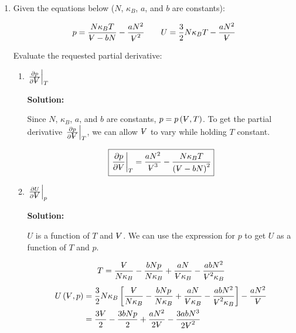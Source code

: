 \documentclass[10pt]{article}
\newenvironment{Solution}
    {\textbf{Solution:}
    
    \vspace{5mm}
    \begin{tcolorbox}
    }
    {
    \end{tcolorbox}
    \vspace{5mm}
    }
\newcommand{\vol}{{\ooalign{\hfil$V$\hfil\cr\kern0.08em--\hfil\cr}}}
\begin{document}
\begin{enumerate}
\begin{enumerate}
\begin{Solution}
    
    \end{Solution}

\end{enumerate}

\item Given the equations below ($N$, $\kappa_B$, $a$, and $b$ are constants):

\begin{equation}
    p = \frac{N\kappa_B T}{\vol -b N}-\frac{a N^2}{\vol^2} \qquad U = \frac{3}{2} N \kappa_B T - \frac{a N^2}{\vol}
\end{equation}

Evaluate the requested partial derivative: 

\begin{enumerate}
    \item $\left.\frac{\partial p}{\partial \vol}\right|_T$
    
    
    \begin{Solution}
    Since $N$, $\kappa_B$, $a$, and $b$ are constants, $p = p\left(\vol, T\right)$. To get the partial derivative $\left.\frac{\partial p}{\partial \vol}\right|_T$, we can allow $\vol$ to vary while holding $T$ constant.
    
    \begin{equation}
    \boxed{
        \left.\frac{\partial p}{\partial \vol}\right|_T =  \frac{a N^2}{\vol^3} - \frac{N\kappa_B T}{\left(\vol -b N\right)^2}
    }
    \end{equation}
    
    \end{Solution}

    \item $\left.\frac{\partial U}{\partial \vol}\right|_p$
    

    \begin{Solution}
    $U$ is a function of $T$ and $\vol$. We can use the expression for $p$ to get $U$ as a function of $T$ and $p$. 
    
    \begin{equation}
        T = \frac{\vol}{N\kappa_B} -\frac{b N p}{N\kappa_B} +  \frac{a N}{\vol\kappa_B} - \frac{a b N^2}{\vol^2\kappa_B}
    \end{equation}
    \begin{align}
        U\left(\vol, p\right) &= \frac{3}{2} N \kappa_B \left[\frac{\vol}{N\kappa_B} -\frac{b N p}{N\kappa_B} + \frac{a N}{\vol\kappa_B} - \frac{a b N^2}{\vol^2\kappa_B}\right] - \frac{a N^2}{\vol}
        \\
        &= \frac{3\vol}{2} - \frac{3 b N p}{2} + \frac{ a N^2}{2 \vol} - \frac{3 a b N^3}{2 \vol^2} 
    \end{align}


\end{Solution}
\end{enumerate}
\end{enumerate}
\end{document}

